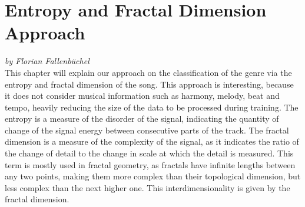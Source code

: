 \chapter{Entropy and Fractal Dimension Approach}
\textit{by Florian Fallenbüchel}\\
This chapter will explain our approach on the classification of the
genre via the entropy and fractal dimension of the song. This approach
is interesting, because it does not consider musical information such as
harmony, melody, beat and tempo, heavily reducing the size of the data
to be processed during training. The entropy is a measure of the
disorder of the signal, indicating the quantity of change of the signal
energy between consecutive parts of the track. The fractal dimension is
a measure of the complexity of the signal, as it indicates the ratio of
the change of detail to the change in scale at which the detail is
measured. This term is mostly used in fractal geometry, as fractals have
infinite lengths between any two points, making them more complex than
their topological dimension, but less complex than the next higher one.
This interdimensionality is given by the fractal dimension.\\

